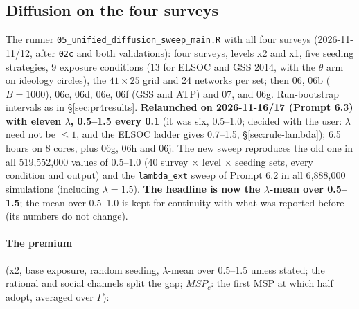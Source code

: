 \documentclass[11pt,a4paper]{article}
\newcommand{\code}[1]{\texttt{#1}}
\begin{document}
\subsection{Diffusion on the four surveys}
\label{sec:pr5results}

The runner \code{05\_unified\_diffusion\_sweep\_main.R} with all four surveys (2026-11-11/12, after
\code{02c} and both validations): four surveys, levels x2 and x1, five seeding strategies, 9 exposure
conditions (13 for ELSOC and GSS 2014, with the $\theta$ arm on ideology circles), the
$41 \times 25$ grid and 24 networks per set; then 06, 06b ($B = 1000$), 06c, 06d, 06e, 06f (GSS and ATP)
and 07, and 06g. Run-bootstrap intervals as in \S\ref{sec:pr4results}.
\textbf{Relaunched on 2026-11-16/17 (Prompt 6.3) with eleven $\lambda$, 0.5--1.5 every 0.1} (it was six,
0.5--1.0; decided with the user: $\lambda$ need not be $\le 1$, and the ELSOC ladder gives 0.7--1.5,
\S\ref{sec:rule-lambda}); 6.5 hours on 8 cores, plus 06g, 06h and 06j. The new sweep reproduces the old
one in all 519{,}552{,}000 values of 0.5--1.0 (40 survey $\times$ level $\times$ seeding sets, every
condition and output) and the \code{lambda\_ext} sweep of Prompt 6.2 in all 6{,}888{,}000 simulations
(including $\lambda = 1.5$). \textbf{The headline is now the $\lambda$-mean over 0.5--1.5}; the mean over
0.5--1.0 is kept for continuity with what was reported before (its numbers do not change).

\paragraph{The premium} (x2, base exposure, random seeding, $\lambda$-mean over 0.5--1.5 unless stated; the
rational and social channels split the gap; $MSP_c$: the first MSP at which half adopt, averaged over $\Gamma$):
\end{document}

